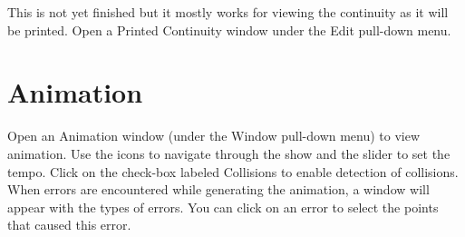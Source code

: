 This is not yet finished but it mostly works for viewing the continuity as it will be printed.  Open a Printed Continuity window under the Edit pull-down menu.

\section{Animation}\label{animwin}

Open an Animation window (under the Window pull-down menu) to view animation.  Use the icons to navigate through the show and the slider to set the tempo.  Click on the check-box labeled Collisions to enable detection of collisions.  When errors are encountered while generating the animation, a window will appear with the types of errors.  You can
click on an error to select the points that caused this error.

